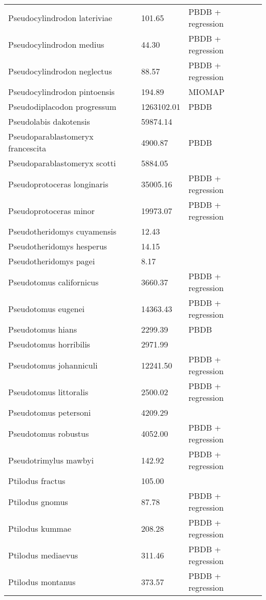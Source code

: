 \documentclass{article}
\begin{document}
\begin{center}
\begin{longtable}{p{} p{} p{}}
    Pseudocylindrodon lateriviae & 101.65 & PBDB + regression \\ 
    Pseudocylindrodon medius & 44.30 & PBDB + regression \\ 
    Pseudocylindrodon neglectus & 88.57 & PBDB + regression \\ 
    Pseudocylindrodon pintoensis & 194.89 & MIOMAP \\ 
    Pseudodiplacodon progressum & 1263102.01 & PBDB \\ 
    Pseudolabis dakotensis & 59874.14 & \cite{Tomiya2013} \\ 
    Pseudoparablastomeryx francescita & 4900.87 & PBDB \\ 
    Pseudoparablastomeryx scotti & 5884.05 & \cite{Tomiya2013} \\ 
    Pseudoprotoceras longinaris & 35005.16 & PBDB + regression \\ 
    Pseudoprotoceras minor & 19973.07 & PBDB + regression \\ 
    Pseudotheridomys cuyamensis & 12.43 & \cite{Tomiya2013} \\ 
    Pseudotheridomys hesperus & 14.15 & \cite{Tomiya2013} \\ 
    Pseudotheridomys pagei & 8.17 & \cite{Tomiya2013} \\ 
    Pseudotomus californicus & 3660.37 & PBDB + regression \\ 
    Pseudotomus eugenei & 14363.43 & PBDB + regression \\ 
    Pseudotomus hians & 2299.39 & PBDB \\ 
    Pseudotomus horribilis & 2971.99 & \cite{Carraway2010} \\ 
    Pseudotomus johanniculi & 12241.50 & PBDB + regression \\ 
    Pseudotomus littoralis & 2500.02 & PBDB + regression \\ 
    Pseudotomus petersoni & 4209.29 & \cite{Carraway2010} \\ 
    Pseudotomus robustus & 4052.00 & PBDB + regression \\ 
    Pseudotrimylus mawbyi & 142.92 & PBDB + regression \\ 
    Ptilodus fractus & 105.00 & \cite{Wilson2012} \\ 
    Ptilodus gnomus & 87.78 & PBDB + regression \\ 
    Ptilodus kummae & 208.28 & PBDB + regression \\ 
    Ptilodus mediaevus & 311.46 & PBDB + regression \\ 
    Ptilodus montanus & 373.57 & PBDB + regression \\ 

\end{longtable}
\end{center}
\end{document}
